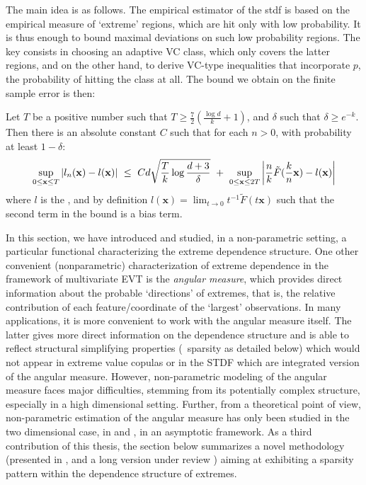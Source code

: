 The main idea is as follows. The empirical estimator of the {\sc stdf} is based on the empirical measure of `extreme' regions, which  are hit only with  low probability. It is thus enough to bound  maximal deviations on such low probability regions. 
 The key consists in choosing an adaptive VC class, which only covers the latter regions, and on the other hand, to derive VC-type inequalities that incorporate $p$, the probability of hitting the class at all. The bound we obtain on the finite sample error is then:

\begin{theorem}
\label{thm:l}
Let $T$ be a positive number such that $T \ge \frac{7}{2}(\frac{\log d}{k} + 1)$, and $\delta$ such that $\delta \ge e^{-k}$. Then there is an absolute constant $C$ such that for each $n >0$, with probability at least $1-\delta$:
\begin{align*}
\sup_{0 \le \mathbf{x} \le T} \left| l_n(\mathbf{x}) - l(\mathbf{x})
\right| ~\le~ Cd\sqrt{\frac{T}{k}\log\frac{d+3}{\delta}} ~+~ \sup_{0
  \le \mathbf{x} \le 2T}\left|\frac{n}{k} \tilde
  F(\frac{k}{n}\mathbf{x})- %
l(\mb x)\right|
\end{align*}
where $l$ is the \stdf, and by definition $l(\mathbf{x})= \lim_{t \to 0} t^{-1} \tilde F (t\mathbf{x}) $ such that the second term in the bound is a bias term.
\end{theorem}


In this section, we have introduced and studied, in a non-parametric setting, a particular functional characterizing the extreme dependence structure.
%
One other convenient (nonparametric) characterization of  extreme dependence in the framework of multivariate EVT is the \textit{angular measure}, which provides direct information about the probable `directions' of extremes, that is, the relative contribution of each feature/coordinate of the `largest' observations.
%
In many applications, it is more convenient to work with the angular measure itself. The latter gives more direct information on the dependence structure and is able to reflect structural simplifying properties (\eg~sparsity as detailed below) which would not appear in extreme value copulas or in the STDF which are integrated version of the angular measure.
However, non-parametric modeling of the angular measure faces major difficulties, stemming from its potentially complex structure, especially in a high dimensional setting.
Further, from a theoretical point of view, non-parametric estimation of the angular measure has only been studied in the two dimensional case, in \cite{Einmahl2001} and \cite{Einmahl2009}, in an asymptotic framework. As a third contribution of this thesis, the section below summarizes a novel methodology (presented in \cite{AISTAT15}, \cite{NIPSWORKSHOP15} and a long version under review \cite{ARXIV16}) aiming at exhibiting a sparsity pattern within the dependence structure of extremes.



